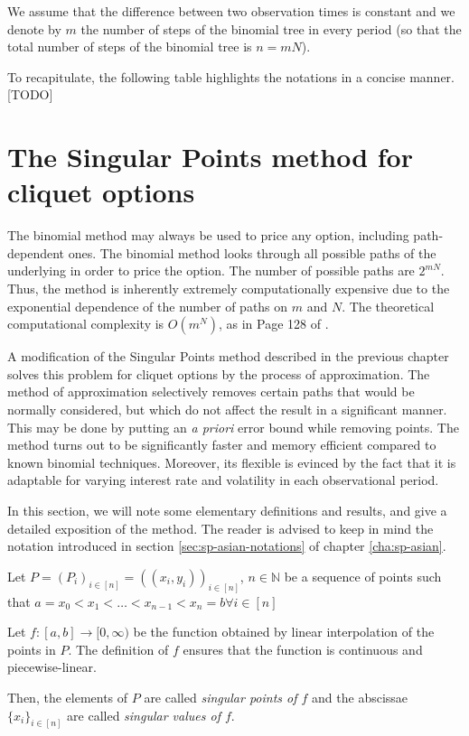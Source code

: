 We assume that the difference between two observation times is constant and we denote by $m$ the number of steps of the binomial tree in every period (so that the total number of steps of the binomial tree is $ n = m N $).

To recapitulate, the following table highlights the notations in a concise manner.
[TODO]



\section{The Singular Points method for cliquet options}
\label{sec:sp-clq-sp}

The binomial method may always be used to price any option, including path-dependent ones. The binomial method looks through all possible paths of the underlying in order to price the option. The number of possible paths are $ 2 ^ {m N} $. Thus, the method is inherently extremely computationally expensive due to the exponential dependence of the number of paths on $m$ and $ N $. The theoretical computational complexity is $ O( m^{N} ) $, as in Page 128 of \cite{Gaudenzi2011}.

A modification of the Singular Points method described in the previous chapter solves this problem for cliquet options by the process of approximation. The method of approximation selectively removes certain paths that would be normally considered, but which do not affect the result in a significant manner. This may be done by putting an \emph{a priori} error bound while removing points. The method turns out to be significantly faster and memory efficient compared to known binomial techniques. Moreover, its flexible is evinced by the fact that it is adaptable for varying interest rate and volatility in each observational period.

In this section, we will note some elementary definitions and results, and give a detailed exposition of the method. The reader is advised to keep in mind the notation introduced in section \ref{sec:sp-asian-notations} of chapter \ref{cha:sp-asian}.

\begin{dfn}
	\label{def:sp-clq-sp}
	Let $ P = (P_i)_{i \in [n]} = ( (x_i, y_i) )_{i \in [n]} $, $ n \in \mathbb{N} $ be a sequence of points such that $ a = x_0 < x_1 < \dots < x_{n-1} < x_n = b \forall i \in [n] $
	
	Let $ f:[a,b] \to [0, \infty) $ be the function obtained by linear interpolation of the points in $P$. The definition of $f$ ensures that the function is continuous and piecewise-linear.
	
	Then, the elements of $P$ are called \emph{singular points of $f$} and the abscissae $ \{ x_i \}_{i \in [n]} $ are called \emph{singular values of $f$}.
\end{dfn}


